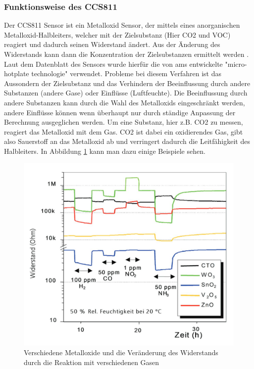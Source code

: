 \documentclass[]{article}
\begin{document}
				\subsubsection{Funktionsweise des CCS811}
					Der CCS811 Sensor ist ein Metalloxid Sensor, der mittels eines anorganischen Metalloxid-Halbleiters, welcher mit der Zielsubstanz (Hier CO2 und VOC) reagiert und dadurch seinen Widerstand ändert. Aus der Änderung des Widerstands kann dann die Konzentration der Zielsubstanzen ermittelt werden \cite{wiki_gassensor}. Laut dem Datenblatt des Sensors wurde hierfür die von ams entwickelte "micro-hotplate technologie" verwendet. Probleme bei diesem Verfahren ist das Aussondern der Zielsubstanz und das Verhindern der Beeinflussung durch andere Substanzen (andere Gase) oder Einflüsse (Luftfeuchte). Die Beeinflussung durch andere Substanzen kann durch die Wahl des Metalloxids eingeschränkt werden, andere Einflüsse können wenn überhaupt nur durch ständige Anpassung der Berechnung ausgeglichen werden. Um eine Substanz, hier z.B. CO2 zu messen, reagiert das Metalloxid mit dem Gas. CO2 ist dabei ein oxidierendes Gas, gibt also Sauerstoff an das Metalloxid ab und verringert dadurch die Leitfähigkeit des Halbleiters. In Abbildung \ref{img:metalloxid_sensor} kann man dazu einige Beispiele sehen.
					\begin{figure}[!h]
						\centering
						\includegraphics[scale=0.30]{images/metalloxid_sensor}
						\caption{Verschiedene Metalloxide und die Veränderung des Widerstands durch die Reaktion mit verschiedenen Gasen\cite{metalloxidsensor}}
						\label{img:metalloxid_sensor}
					\end{figure}
					
\end{document}
